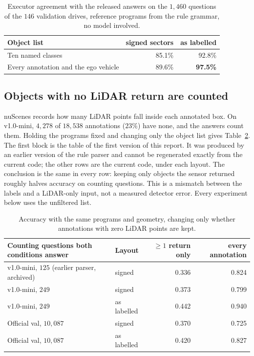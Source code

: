 \documentclass[11pt,a4paper]{article}
\begin{document}
\begin{table}[ht]
\centering
\small
\begin{tabular}{lrr}
\toprule
Object list & signed sectors & as labelled \\
\midrule
Ten named classes              & 85.1\% & 92.8\% \\
Every annotation and the ego vehicle & 89.6\% & \textbf{97.5\%} \\
\bottomrule
\end{tabular}
\caption{Executor agreement with the released answers on the $1{,}460$
questions of the $146$ validation drives, reference programs from the rule
grammar, no model involved.}
\label{tab:valexec}
\end{table}

\subsection{Objects with no LiDAR return are counted}
\label{sec:lidar}

nuScenes records how many LiDAR points fall inside each annotated box. On
v1.0-mini, $4{,}278$ of $18{,}538$ annotations ($23\%$) have none, and the
answers count them. Holding the programs fixed and changing only the object
list gives Table~\ref{tab:lidar}. The first block is the table of the first
version of this report. It was produced by an earlier version of the rule
parser and cannot be regenerated exactly from the current code; the other
rows are the current code, under each layout. The conclusion is the same in
every row: keeping only objects the sensor returned roughly halves accuracy
on counting questions. This is a mismatch between the labels and a
LiDAR-only input, not a measured detector error. Every experiment below uses
the unfiltered list.

\begin{table}[ht]
\centering
\small
\begin{tabular}{llrr}
\toprule
Counting questions both conditions answer & Layout & $\ge 1$ return only & every annotation \\
\midrule
v1.0-mini, $125$ (earlier parser, archived) & signed      & 0.336 & 0.824 \\
\midrule
v1.0-mini, $249$                            & signed      & 0.373 & 0.799 \\
v1.0-mini, $249$                            & as labelled & 0.442 & 0.940 \\
Official val, $10{,}087$                    & signed      & 0.370 & 0.725 \\
Official val, $10{,}087$                    & as labelled & 0.420 & 0.827 \\
\bottomrule
\end{tabular}
\caption{Accuracy with the same programs and geometry, changing only whether
annotations with zero LiDAR points are kept.}
\label{tab:lidar}
\end{table}
\end{document}
